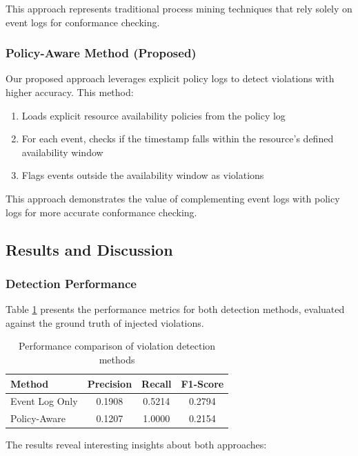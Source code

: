 This approach represents traditional process mining techniques that rely solely on event logs for conformance checking.

\subsubsection{Policy-Aware Method (Proposed)}
Our proposed approach leverages explicit policy logs to detect violations with higher accuracy. This method:

\begin{enumerate}
    \item Loads explicit resource availability policies from the policy log
    \item For each event, checks if the timestamp falls within the resource's defined availability window
    \item Flags events outside the availability window as violations
\end{enumerate}

This approach demonstrates the value of complementing event logs with policy logs for more accurate conformance checking.

\subsection{Results and Discussion}

\subsubsection{Detection Performance}
Table \ref{tab:detection-performance} presents the performance metrics for both detection methods, evaluated against the ground truth of injected violations.

\begin{table}[h]
\centering
\caption{Performance comparison of violation detection methods}
\label{tab:detection-performance}
\begin{tabular}{lccc}
\hline
\textbf{Method} & \textbf{Precision} & \textbf{Recall} & \textbf{F1-Score} \\
\hline
Event Log Only & 0.1908 & 0.5214 & 0.2794 \\
Policy-Aware & 0.1207 & 1.0000 & 0.2154 \\
\hline
\end{tabular}
\end{table}

The results reveal interesting insights about both approaches:

